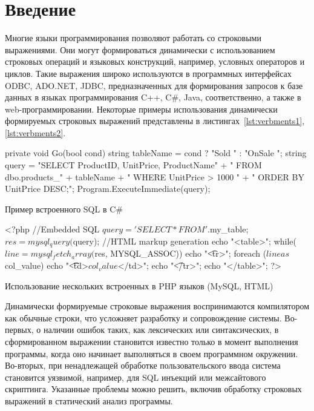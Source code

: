 \documentclass[10pt, conference, compsocconf]{IEEEtran}
\begin{document}
\section{Введение}

Многие языки программирования позволяют работать со строковыми выражениями. Они могут формироваться динамически с использованием строковых операций и языковых конструкций, например, условных операторов и циклов. Такие выражения широко используются в программных интерфейсах ODBC, ADO.NET, JDBC, предназначенных для формирования запросов к базе данных в языках программирования C++, C\#, Java, соответственно, а также в web-программировании. Некоторые примеры использования динамически формируемых строковых выражений представлены в листингах~\ref{lst:verbments1}, \ref{lst:verbments2}. 

\begin{listing}[h]
\begin{pyglist}[language=csharp,numbers=none,numbersep=5pt]
 private void Go(bool cond)
 {
   string tableName = cond ? "Sold " : "OnSale ";
   string query =
       "SELECT ProductID, UnitPrice, ProductName" 
           + " FROM dbo.products_" + tableName
           + " WHERE UnitPrice > 1000 "
           + " ORDER BY UnitPrice DESC;";
   Program.ExecuteImmediate(query);
 }
\end{pyglist}
\caption{Пример встроенного SQL в C\#}
\label{lst:verbments1}
\end{listing}


\begin{listing}[h]
\begin{pyglist}[language=php,numbers=none,numbersep=5pt]
<?php
//Embedded SQL
$query = 'SELECT * FROM '. $my_table;
$res = mysql_query($query);
//HTML markup generation
echo "<table>\n";
while($line=mysql_fetch_array($res, MYSQL_ASSOC)){
echo "\t<tr>\n";	
foreach ($line as $col_value){
echo "\t\t<td>$col_value$</td>\n";}
echo "\t</tr>\n";}
echo "</table>\n";
?>
\end{pyglist}
\caption{Использование нескольких встроенных в PHP языков (MySQL, HTML)}
\label{lst:verbments2}
\end{listing}


Динамически формируемые строковые выражения воспринимаются компилятором как обычные строки, что усложняет разработку и сопровождение системы. Во-первых, о наличии ошибок таких, как лексических или синтаксических, в сформированном выражении становится известно только в момент выполнения программы, когда оно начинает выполняться в своем программном окружении. Во-вторых,  при ненадлежащей обработке пользовательского ввода система становится уязвимой, например, для SQL инъекций или межсайтового скриптинга. Указанные проблемы можно решить, включив обработку строковых выражений в статический анализ программы. 
\end{document}
